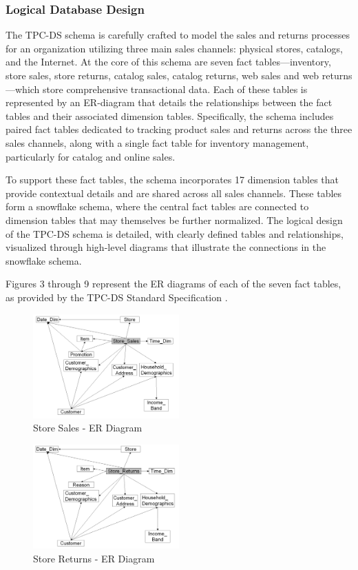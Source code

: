 \documentclass[conference]{IEEEtran}
\begin{document}
\subsubsection{Logical Database Design}

The TPC-DS schema is carefully crafted to model the sales and returns processes for an organization utilizing three main sales channels:
physical stores, catalogs, and the Internet. At the core of this schema are seven fact tables—inventory, store sales, store returns,
catalog sales, catalog returns, web sales and web returns—which store comprehensive transactional data. Each of these tables is represented
by an ER-diagram that details the relationships between the fact tables and their associated dimension tables. Specifically, the schema
includes paired fact tables dedicated to tracking product sales and returns across the three sales channels, along with a single fact table
for inventory management, particularly for catalog and online sales.

To support these fact tables, the schema incorporates 17 dimension tables that provide contextual details and are shared across all sales channels.
These tables form a snowflake schema, where the central fact tables are connected to dimension tables that may themselves be further normalized.
The logical design of the TPC-DS schema is detailed, with clearly defined tables and relationships, visualized through high-level diagrams that
illustrate the connections in the snowflake schema.

Figures 3 through 9 represent the ER diagrams of each of the seven fact tables, as provided by the TPC-DS Standard Specification \cite{b1}.

\begin{figure}[h]
    \centering
    \includegraphics[width=0.5\textwidth]{images/ER_Diagrams/Store Sales - ER Diagram.png}
    \caption{Store Sales - ER Diagram}
    \label{fig:store_sales_er_diagram}
\end{figure}

\begin{figure}[h]
    \centering
    \includegraphics[width=0.5\textwidth]{images/ER_Diagrams/Store Returns - ER Diagram.png}
    \caption{Store Returns - ER Diagram}
    \label{fig:store_returns_er_diagram}
\end{figure}
\end{document}
